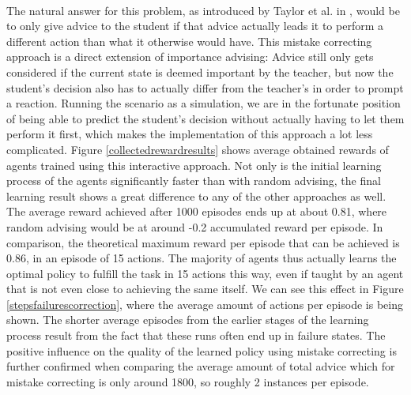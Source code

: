 \documentclass[12pt,twoside]{article}
\theoremstyle{plain}
\theoremstyle{definition}
\theoremstyle{remark}
\begin{document}
\\
The natural answer for this problem, as introduced by Taylor et al. in \cite{Taylor2014reinforcement}, would be to only give advice to the student if that advice actually leads it to perform a different action than what it otherwise would have. This mistake correcting approach is a direct extension of importance advising: Advice still only gets considered if the current state is deemed important by the teacher, but now the student's decision also has to actually differ from the teacher's in order to prompt a reaction. Running the scenario as a simulation, we are in the fortunate position of being able to predict the student's decision without actually having to let them perform it first, which makes the implementation of this approach a lot less complicated. Figure \ref{collectedrewardresults} shows average obtained rewards of agents trained using this interactive approach. Not only is the initial learning process of the agents significantly faster than with random advising, the final learning result shows a great difference to any of the other approaches as well. The average reward achieved after 1000 episodes ends up at about 0.81, where random advising would be at around -0.2 accumulated reward per episode. In comparison, the theoretical maximum reward per episode that can be achieved is 0.86, in an episode of 15 actions. The majority of agents thus actually learns the optimal policy to fulfill the task in 15 actions this way, even if taught by an agent that is not even close to achieving the same itself. We can see this effect in Figure \ref{stepsfailurescorrection}, where the average amount of actions per episode is being shown. The shorter average episodes from the earlier stages of the learning process result from the fact that these runs often end up in failure states. The positive influence on the quality of the learned policy using mistake correcting is further confirmed when comparing the average amount of total advice which for mistake correcting is only around 1800, so roughly 2 instances per episode. \\
\end{document}
